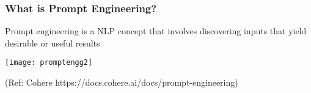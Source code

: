 








\begin{frame}[fragile]\frametitle{What is Prompt Engineering?}

Prompt engineering is a NLP concept that involves discovering inputs that yield desirable or useful results


\begin{center}
\texttt{[image: promptengg2]}

{\tiny (Ref: Cohere https://docs.cohere.ai/docs/prompt-engineering)}

\end{center}				
			
			

\end{frame}




